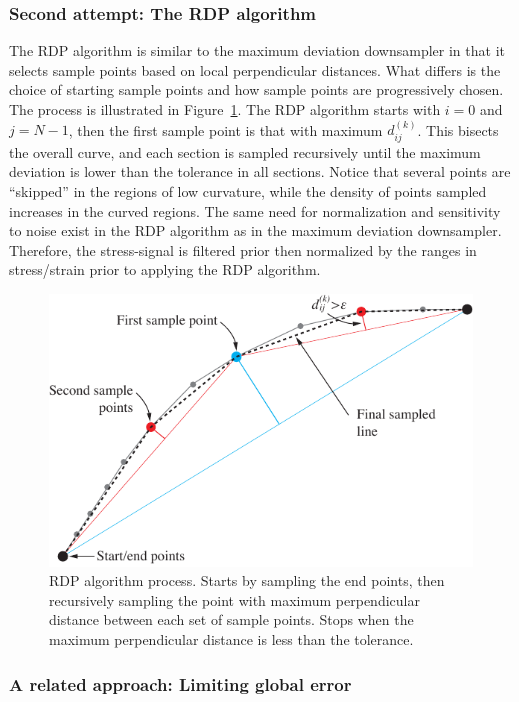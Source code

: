 \documentclass[a4paper,11pt]{article}
\begin{document}
\subsubsection{Second attempt: The RDP algorithm}

The RDP algorithm is similar to the maximum deviation downsampler in that it selects sample points based on local perpendicular distances.
What differs is the choice of starting sample points and how sample points are progressively chosen.
The process is illustrated in Figure~\ref{fig:rdp-algo}.
The RDP algorithm starts with $i = 0$ and $j = N-1$, then the first sample point is that with maximum $d^{(k)}_{ij}$.
This bisects the overall curve, and each section is sampled recursively until the maximum deviation is lower than the tolerance in all sections.
Notice that several points are ``skipped'' in the regions of low curvature, while the density of points sampled increases in the curved regions.
The same need for normalization and sensitivity to noise exist in the RDP algorithm as in the maximum deviation downsampler.
Therefore, the stress-signal is filtered prior then normalized by the ranges in stress/strain prior to applying the RDP algorithm.


\begin{figure}
    \centering
    \includegraphics[scale=1]{rdp_illustration.pdf}
    \caption{RDP algorithm process. Starts by sampling the end points, then recursively sampling the point with maximum perpendicular distance between each set of sample points. Stops when the maximum perpendicular distance is less than the tolerance.}
    \label{fig:rdp-algo}
\end{figure}

\subsubsection{A related approach: Limiting global error}
\end{document}
